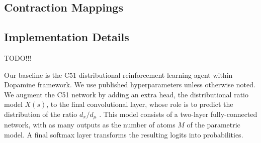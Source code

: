 \documentclass[12pt,a4paper,openright,twoside]{article}
\numberwithin{equation}{section}
\theoremstyle{definition}
\theoremstyle{remark}
\theoremstyle{plain}
\begin{document}





\subsection{Contraction Mappings} \label{contractionTheory}



\subsection{Implementation Details}

TODO!!!

Our baseline is the C51 distributional reinforcement learning agent\cite{DRL} within Dopamine framework\cite{dopamine}. We use published hyperparameters unless otherwise noted. We augment the C51 network by adding an extra head, the distributional ratio model $X(s)$, to the final convolutional layer, whose role is to predict the distribution of the ratio $d_\pi / d_\mu$ . This model consists of a two-layer fully-connected network, with as many outputs as the number of atoms $M$ of the parametric model. A final softmax layer transforms the resulting logits into probabilities. 

\newpage
\end{document}
